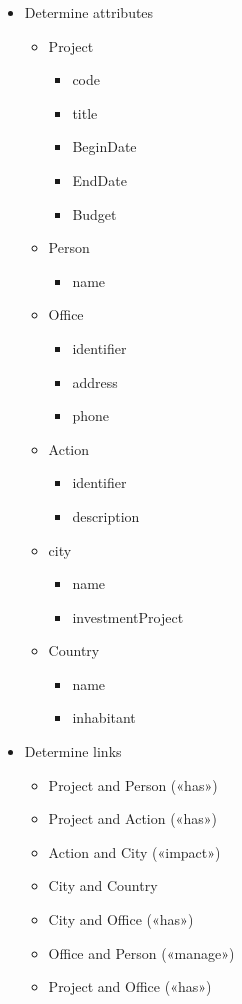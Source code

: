 \documentclass[13pt,a4paper]{report}
\begin{document}
\begin{itemize}
\item Determine attributes
	\begin{itemize}
	\item Project
		\begin{itemize}
		\item code
		\item title
		\item BeginDate
		\item EndDate
		\item Budget
		\end{itemize}
	\item Person
		\begin{itemize}
		\item name
		\end{itemize}
	\item Office
		\begin{itemize}
		\item identifier
		\item address
		\item phone
		\end{itemize}
	\item Action
		\begin{itemize}
		\item identifier
		\item description
		\end{itemize}
	\item city
		\begin{itemize}
		\item name
		\item investmentProject
		\end{itemize}
	\item Country
		\begin{itemize}
		\item name
		\item inhabitant
		\end{itemize}
	\end{itemize}

\item Determine links
	\begin{itemize}
	\item Project and Person («has»)
	\item Project and Action («has»)
	\item Action and City («impact»)
	\item City and Country
	\item City and Office («has»)
	\item Office and Person («manage»)
	\item Project and Office («has»)
	\end{itemize}


\end{itemize}
\end{document}
